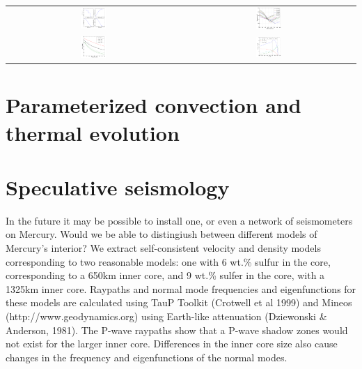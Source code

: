 \documentclass[landscape,a0b,final]{a0poster}
\begin{document}
\begin{multicols}{3}
\begin{center}
\begin{tabular}{cc}
 \includegraphics[width=0.15\textwidth]{profiles.png} &
 \includegraphics[width=0.15\textwidth]{Liquidus_model.png} \\
 \includegraphics[width=0.15\textwidth]{clapeyron_1.png} &
 \includegraphics[width=0.15\textwidth]{core_energetics.png} \\
\end{tabular}
\label{interior_model}
\end{center}

\columnbreak

\section*{Parameterized convection and thermal evolution}



\section*{Speculative seismology}

In the future it may be possible to install one, or even a network of seismometers on Mercury. Would we be able to distingiush between different models of Mercury's interior? We extract self-consistent velocity and density models corresponding to two reasonable models: one with 6 wt.\% sulfur in the core, corresponding to a 650km inner core, and 9 wt.\% sulfer in the core, with a 1325km inner core.
Raypaths and normal mode frequencies and eigenfunctions for these models are calculated using TauP Toolkit (Crotwell et al 1999) and Mineos (http://www.geodynamics.org) using Earth-like attenuation (Dziewonski \&  Anderson, 1981). The P-wave raypaths show that a P-wave shadow zones would not exist for the larger inner core. Differences in the inner core size also cause changes in the frequency and eigenfunctions of the normal modes. 


\end{multicols}
\end{document}
